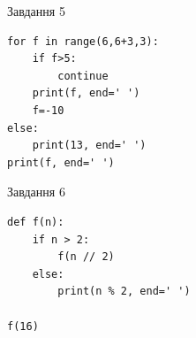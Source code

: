 \documentclass[12pt, ukrainian]{article}
\begin{document}
{\vspace{15mm}
\begin{minipage}[t]{9.7cm}                
{\begin{center}Завдання {5}\end{center}}
\begin{verbatim}
for f in range(6,6+3,3):
    if f>5:
        continue
    print(f, end=' ')
    f=-10
else:
    print(13, end=' ')
print(f, end=' ')
\end{verbatim}     
\end{minipage}
\vline \hspace{8mm}
\begin{minipage}[t]{8.0cm}                
{\begin{center}Завдання {6}\end{center}}
\begin{verbatim}
def f(n):
    if n > 2:
        f(n // 2)
    else:
        print(n % 2, end=' ')

f(16)
\end{verbatim}     
\end{minipage}

}
\newpage
\end{document}
